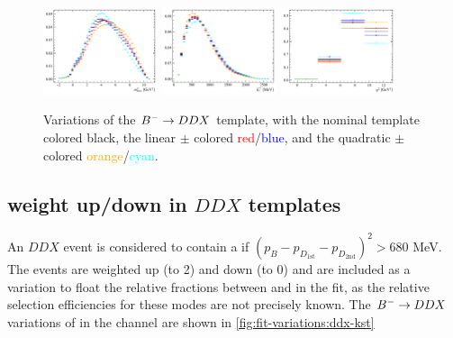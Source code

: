 \begin{figure}[!htb]
    \centering
    \includegraphics[width=0.3\textwidth]{./figs-fit-fit-variations/histo-var/D0_iso_uDDMu__vs__D0_iso_uDDMu_dal_lm__vs__D0_iso_uDDMu_dal_lp__vs__D0_iso_uDDMu_dal_qm__vs__D0_iso_uDDMu_dal_qp__m2miss.pdf}
    \includegraphics[width=0.3\textwidth]{./figs-fit-fit-variations/histo-var/D0_iso_uDDMu__vs__D0_iso_uDDMu_dal_lm__vs__D0_iso_uDDMu_dal_lp__vs__D0_iso_uDDMu_dal_qm__vs__D0_iso_uDDMu_dal_qp__el.pdf}
    \includegraphics[width=0.3\textwidth]{./figs-fit-fit-variations/histo-var/D0_iso_uDDMu__vs__D0_iso_uDDMu_dal_lm__vs__D0_iso_uDDMu_dal_lp__vs__D0_iso_uDDMu_dal_qm__vs__D0_iso_uDDMu_dal_qp__q2.pdf}

    \caption{
        Variations of the
        ${{{B}^-}} \rightarrow DDX$ template,
        with the nominal template colored black,
        the linear $\pm$ colored \textcolor{red}{red}/\textcolor{blue}{blue},
        and the quadratic $\pm$ colored
        \textcolor{orange}{orange}/\textcolor{cyan}{cyan}.
    }
    \label{fig:fit-variations:ddx}
\end{figure}


\subsection{\Kstar weight up/down in $DDX$ templates}
\label{ref:fit:var:ddx-kst}

An $DDX$ event is considered to contain a \Kstar if
$(p_B - p_{D_\text{1st}} - p_{D_\text{2nd}})^2 > 680$ MeV.
The \Kstar events are weighted up (to 2) and down (to 0) and are included as
a variation to float the relative fractions between \kaon and \Kstar in the fit,
as the relative selection efficiencies for these modes are not precisely known.
The ${{{B}^-}} \rightarrow DDX$ variations of \Kstar in the \Dz channel are shown
in \cref{fig:fit-variations:ddx-kst}

